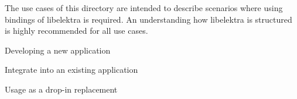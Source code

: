 \label{doc_usecases_bindings_README_md_md_doc_usecases_bindings_README}%
%
 The use cases of this directory are intended to describe scenarios where using bindings of libelektra is required. An understanding how libelektra is structured is highly recommended for all use cases.


\begin{DoxyItemize}
\item Developing a new application
\item Integrate into an existing application
\item Usage as a drop-\/in replacement 
\end{DoxyItemize}